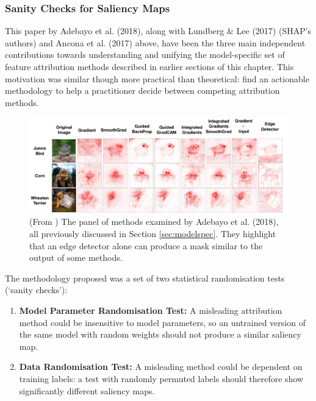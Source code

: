 \documentclass[main]{subfiles}
\begin{document}
\subsubsection{Sanity Checks for Saliency Maps \cite{sanity}}




This paper by Adebayo et al. (2018), along with Lundberg \& Lee (2017) (SHAP's authors) and Ancona et al. (2017) above, have been the three main independent contributions towards understanding and unifying the model-specific set of feature attribution methods described in earlier sections of this chapter. This motivation was similar though more practical than theoretical: find an actionable methodology to help a practitioner decide between competing attribution methods.

\begin{figure}[h]
\centering
\includegraphics[scale=0.6]{adebayo_panel.png}
\caption{(From \cite{sanity}) The panel of methods examined by Adebayo et al. (2018), all previously discussed in Section \ref{sec:modelspec}. They highlight that an edge detector alone can produce a mask similar to the output of some methods.}
\label{adebayoimg}
\end{figure}


The methodology proposed was a set of two statistical randomisation tests (`sanity checks'):
\newpage

\begin{enumerate}
\item \textbf{Model Parameter Randomisation Test:} A misleading attribution method could be insensitive to model parameters, so an untrained version of the same model with random weights should not produce a similar saliency map.
\item \textbf{Data Randomisation Test:} A misleading method could be dependent on training labels: a test with randomly permuted labels should therefore show significantly different saliency maps.
\end{enumerate}
\end{document}

